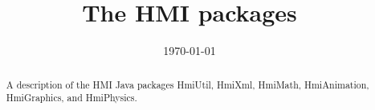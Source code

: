 \documentclass[10pt, oneside]{memoir}
\begin{document}
\title{The HMI packages}
\date{\today}
\author{}



\maketitle{}
\def\abstractname{}
\begin{abstract}
\noindent
A description of the HMI Java packages HmiUtil, HmiXml, HmiMath, HmiAnimation, HmiGraphics, and HmiPhysics.
\end{abstract}









%

%

%
%
\end{document}

